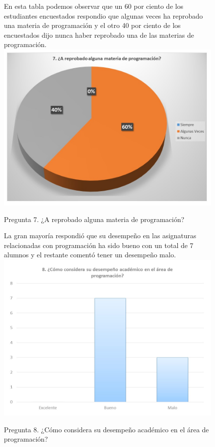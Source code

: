 \documentclass[12pt] {report}
\begin{document}
\begin{figure}[H]
\centering
En esta tabla podemos observar que un 60 por ciento de los estudiantes encuestados respondio que algunas veces ha reprobado una materia de programación y el otro 40 por ciento de los encuestados dijo nunca haber reprobado una de las materias de programación.   
\includegraphics[scale=.4]{pregunta7.JPG}
\caption{Pregunta 7. ¿A reprobado alguna materia de programación?}
\end{figure}
\begin{figure}[H]
\centering
La gran mayoría respondió que su desempeño en las asignaturas relacionadas con programación ha sido bueno con un total de 7 alumnos y el restante comentó tener un desempeño malo.  
\includegraphics[scale=.4]{pregunta8.JPG}
\caption{Pregunta 8. ¿Cómo considera su desempeño académico en el área de programación?}
\end{figure}
\end{document}
